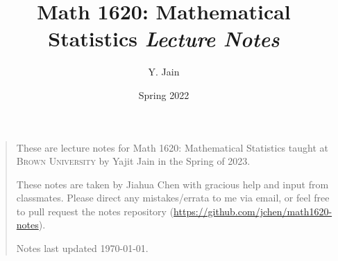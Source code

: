 \documentclass[letterpaper, 11pt, colorful, sections]{jiahua}
\title{Math 1620: Mathematical Statistics \textit{Lecture Notes}}
\author{Y. Jain}
\date{Spring 2022}
\numberwithin{equation}{section}
\begin{document}
\maketitle
\begin{quote}
    \quad These are lecture notes for Math 1620: Mathematical Statistics taught at \textsc{Brown University} by Yajit Jain in the Spring of 2023.

    \quad These notes are taken by Jiahua Chen with gracious help and input from classmates. Please direct any mistakes/errata to me via email, or feel free to pull request the notes repository (\url{https://github.com/jchen/math1620-notes}).

    \quad Notes last updated \today.
\end{quote}
\tableofcontents



\newpage








\end{document}
